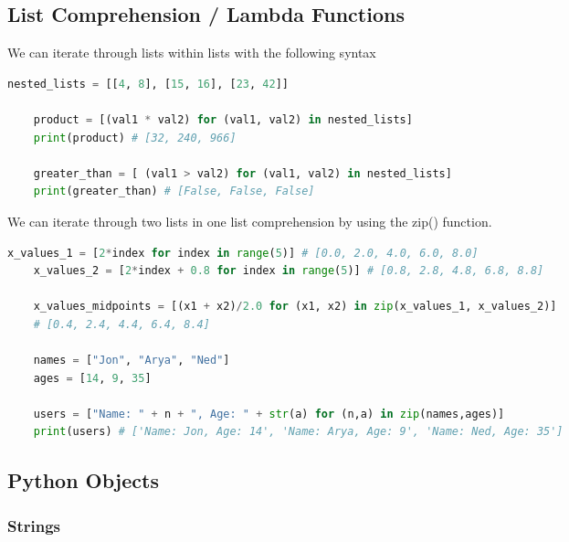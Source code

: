 \documentclass[11pt, a4paper]{article}
\begin{document}
\begin{spacing}{1.1}
	\subsection{List Comprehension / Lambda Functions}
	We can iterate through lists within lists with the following syntax
	\begin{lstlisting}[language=Python]
	nested_lists = [[4, 8], [15, 16], [23, 42]]
	
	product = [(val1 * val2) for (val1, val2) in nested_lists]
	print(product) # [32, 240, 966]	
	
	greater_than = [ (val1 > val2) for (val1, val2) in nested_lists]
	print(greater_than) # [False, False, False] \end{lstlisting}\vspace*{1mm}
	We can iterate through two lists in one list comprehension by using the zip() function.
	\begin{lstlisting}[language=Python]
	x_values_1 = [2*index for index in range(5)] # [0.0, 2.0, 4.0, 6.0, 8.0] 
	x_values_2 = [2*index + 0.8 for index in range(5)] # [0.8, 2.8, 4.8, 6.8, 8.8] 
	
	x_values_midpoints = [(x1 + x2)/2.0 for (x1, x2) in zip(x_values_1, x_values_2)]
	# [0.4, 2.4, 4.4, 6.4, 8.4]	
	
	names = ["Jon", "Arya", "Ned"]
	ages = [14, 9, 35]
	
	users = ["Name: " + n + ", Age: " + str(a) for (n,a) in zip(names,ages)]
	print(users) # ['Name: Jon, Age: 14', 'Name: Arya, Age: 9', 'Name: Ned, Age: 35'] \end{lstlisting}\vspace*{4mm}
	\subsection{Python Objects}
	\subsubsection{Strings}
	
	
	
	
	
	
	
	
\end{spacing}
\end{document}
